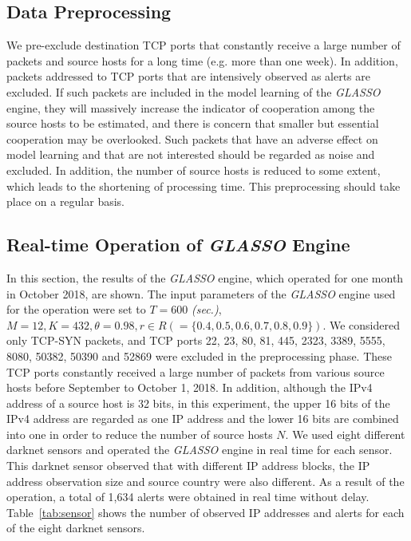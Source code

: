 \documentclass[conference]{IEEEtran}
\begin{document}
\subsection{Data Preprocessing}
We pre-exclude destination TCP ports that constantly receive a large number of packets and source hosts for a long time (e.g. more than one week).
In addition, packets addressed to TCP ports that are intensively observed as alerts are excluded.
If such packets are included in the model learning of the {\it GLASSO} engine, they will massively increase the indicator of cooperation among the source hosts to be estimated, and there is concern that smaller but essential cooperation may be overlooked.
Such packets that have an adverse effect on model learning and that are not interested should be regarded as noise and excluded.
In addition, the number of source hosts is reduced to some extent, which leads to the shortening of processing time.
This preprocessing should take place on a regular basis.



\subsection{Real-time Operation of {\it GLASSO} Engine}
In this section, the results of the {\it GLASSO} engine, which operated for one month in October 2018, are shown.
The input parameters of the {\it GLASSO} engine used for the operation were set to $T=600$ {\it (sec.)}, $M=12, K=432, \theta=0.98, r \in R ( = \{0.4, 0.5, 0.6, 0.7, 0.8, 0.9\})$.
We considered only TCP-SYN packets, and TCP ports 22, 23, 80, 81, 445, 2323, 3389, 5555, 8080, 50382, 50390 and 52869 were excluded in the preprocessing phase.
These TCP ports constantly received a large number of packets from various source hosts before September to October 1, 2018.
In addition, although the IPv4 address of a source host is 32 bits, in this experiment, the upper 16 bits of the IPv4 address are regarded as one IP address and the lower 16 bits are combined into one in order to reduce the number of source hosts $N$.
We used eight different darknet sensors and operated the {\it GLASSO} engine in real time for each sensor.
This darknet sensor observed that with different IP address blocks, the IP address observation size and source country were also different.
As a result of the operation, a total of 1,634 alerts were obtained in real time without delay.
Table~\ref{tab:sensor} shows the number of observed IP addresses and alerts for each of the eight darknet sensors.
\end{document}
